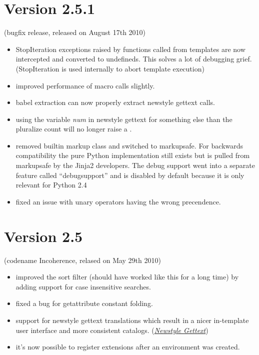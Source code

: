 \documentclass[a4paper,10pt,english]{sphinxmanual}
\begin{document}
\section{Version 2.5.1}
\label{changelog:version-2-5-1}
(bugfix release, released on August 17th 2010)
\begin{itemize}
\item {} 
StopIteration exceptions raised by functions called from templates
are now intercepted and converted to undefineds.  This solves a
lot of debugging grief.  (StopIteration is used internally to
abort template execution)

\item {} 
improved performance of macro calls slightly.

\item {} 
babel extraction can now properly extract newstyle gettext calls.

\item {} 
using the variable \emph{num} in newstyle gettext for something else
than the pluralize count will no longer raise a .

\item {} 
removed builtin markup class and switched to markupsafe.  For backwards
compatibility the pure Python implementation still exists but is
pulled from markupsafe by the Jinja2 developers.  The debug support
went into a separate feature called ``debugsupport'' and is disabled
by default because it is only relevant for Python 2.4

\item {} 
fixed an issue with unary operators having the wrong precendence.

\end{itemize}


\section{Version 2.5}
\label{changelog:version-2-5}
(codename Incoherence, relased on May 29th 2010)
\begin{itemize}
\item {} 
improved the sort filter (should have worked like this for a
long time) by adding support for case insensitive searches.

\item {} 
fixed a bug for getattribute constant folding.

\item {} 
support for newstyle gettext translations which result in a
nicer in-template user interface and more consistent
catalogs. ({\hyperref[extensions:newstyle-gettext]{\emph{Newstyle Gettext}}})

\item {} 
it's now possible to register extensions after an environment
was created.

\end{itemize}
\end{document}
